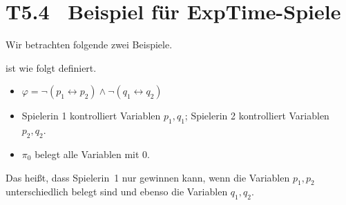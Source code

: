 \documentclass[fontsize=11pt, twoside=false, numbers=autoenddot]{scrbook}
\begin{document}
\pagebreak
\section*{T5.4~ Beispiel für \textsf{ExpTime}-Spiele}

Wir betrachten folgende zwei Beispiele.

\parII
{} ist wie folgt definiert.
%
\begin{itemize}
  \item
    $\varphi = \lnot(p_1 \leftrightarrow p_2) \land \lnot(q_1 \leftrightarrow q_2)$
  \item
    Spielerin 1 kontrolliert Variablen $p_1,q_1$;
    Spielerin 2 kontrolliert Variablen $p_2,q_2$.
  \item
    $\pi_0$ belegt alle Variablen mit 0.
\end{itemize}
Das heißt, dass Spielerin~1 nur gewinnen kann, wenn die Variablen $p_1,p_2$
unterschiedlich belegt sind und ebenso die Variablen $q_1,q_2$.
\end{document}
